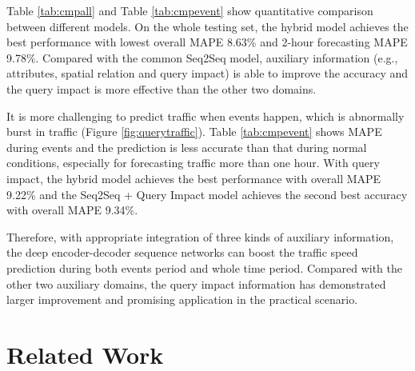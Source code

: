 Table \ref{tab:cmpall} and Table \ref{tab:cmpevent} show quantitative comparison between different models. On the whole testing set, the hybrid model achieves the best performance with lowest overall MAPE 8.63\% and 2-hour forecasting MAPE 9.78\%. Compared with the common Seq2Seq model, auxiliary information (e.g., attributes, spatial relation and query impact) is able to improve the accuracy and the query impact is more effective than the other two domains.

It is more challenging to predict traffic when events happen, which is abnormally burst in traffic (Figure \ref{fig:querytraffic}). Table \ref{tab:cmpevent} shows MAPE during events and the prediction is less accurate than that during normal conditions, especially for forecasting traffic more than one hour. With query impact, the hybrid model achieves the best performance with overall MAPE 9.22\% and the Seq2Seq + Query Impact model achieves the second best accuracy with overall MAPE 9.34\%.

Therefore, with appropriate integration of three kinds of auxiliary information, the deep encoder-decoder sequence networks can boost the traffic speed prediction during both events period and whole time period. Compared with the other two auxiliary domains, the query impact information has demonstrated larger improvement and promising application in the practical scenario.


\section{Related Work}
\label{relatedwork}


